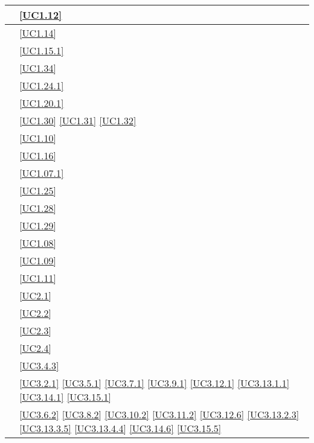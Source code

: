 \begin{longtable}{|P{6cm}|P{6cm}|}
	\hline {} & \ref{UC1.12} \\
	\hline {} & \ref{UC1.14} \\
	\hline {} & \ref{UC1.15.1} \\
	\hline {} & \ref{UC1.34} \\
	\hline {} & \ref{UC1.24.1} \\
	\hline {} & \ref{UC1.20.1} \\	
	\hline {} & \ref{UC1.30} \linebreak \ref{UC1.31} \linebreak \ref{UC1.32} \\
	\hline {} & \ref{UC1.10} \\
	\hline {} & \ref{UC1.16} \\
	\hline {} & \ref{UC1.07.1} \\
	\hline {} & \ref{UC1.25} \\
	\hline {} & \ref{UC1.28} \\
	\hline {} & \ref{UC1.29}  \\	 
	\hline {} & \ref{UC1.08} \\
	\hline {} & \ref{UC1.09} \\
	\hline {} & \ref{UC1.11} \\	
	\hline {} & \ref{UC2.1} \\
	\hline {} & \ref{UC2.2} \\
	\hline {} & \ref{UC2.3} \\
	\hline {} & \ref{UC2.4} \\	
	\hline {} & \ref{UC3.4.3} \\
	\hline {} & \ref{UC3.2.1} \linebreak \ref{UC3.5.1} \linebreak \ref{UC3.7.1} \linebreak \ref{UC3.9.1} \linebreak \ref{UC3.12.1} \linebreak \ref{UC3.13.1.1} \linebreak \ref{UC3.14.1} \linebreak \ref{UC3.15.1} \\
	\hline {} & \ref{UC3.6.2} \linebreak \ref{UC3.8.2} \linebreak \ref{UC3.10.2} \ref{UC3.11.2} \linebreak \ref{UC3.12.6}  \linebreak \ref{UC3.13.2.3} \linebreak \ref{UC3.13.3.5}  \linebreak \ref{UC3.13.4.4} \linebreak \ref{UC3.14.6} \linebreak \ref{UC3.15.5}\\

\end{longtable}
